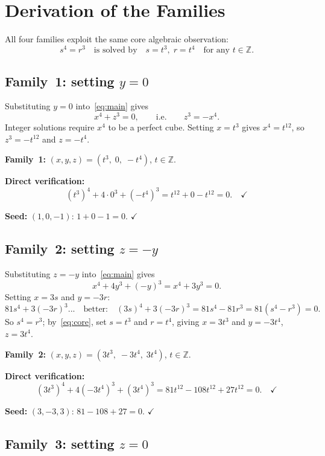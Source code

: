 \documentclass[12pt,a4paper]{article}
\theoremstyle{definition}
\newcommand{\Z}{\mathbb{Z}}
\begin{document}
\section{Derivation of the Families}\label{sec:derivation}

All four families exploit the same core algebraic observation:
\begin{equation}\label{eq:core}
  s^4 = r^3 \quad \text{is solved by} \quad s = t^3,\; r = t^4 \quad \text{for any } t \in \Z.
\end{equation}

\subsection{Family~1: setting $y = 0$}\label{sec:fam1}

Substituting $y = 0$ into~\eqref{eq:main} gives
\[
  x^4 + z^3 = 0, \qquad \text{i.e.} \qquad z^3 = -x^4.
\]
Integer solutions require $x^4$ to be a perfect cube.  Setting $x = t^3$
gives $x^4 = t^{12}$, so $z^3 = -t^{12}$ and $z = -t^4$.

\textbf{Family~1:} $(x, y, z) = (t^3,\; 0,\; -t^4)$, $t \in \Z$.

\textbf{Direct verification:}
\[
  (t^3)^4 + 4 \cdot 0^3 + (-t^4)^3 = t^{12} + 0 - t^{12} = 0.\quad\checkmark
\]

\textbf{Seed:} $(1, 0, -1)$: $1 + 0 - 1 = 0$. $\checkmark$

\subsection{Family~2: setting $z = -y$}\label{sec:fam2}

Substituting $z = -y$ into~\eqref{eq:main} gives
\[
  x^4 + 4y^3 + (-y)^3 = x^4 + 3y^3 = 0.
\]
Setting $x = 3s$ and $y = -3r$:
\[
  81s^4 + 3(-3r)^3... \quad\text{better:}\quad
  (3s)^4 + 3(-3r)^3 = 81s^4 - 81r^3 = 81(s^4 - r^3) = 0.
\]
So $s^4 = r^3$; by~\eqref{eq:core}, set $s = t^3$ and $r = t^4$, giving
$x = 3t^3$ and $y = -3t^4$, $z = 3t^4$.

\textbf{Family~2:} $(x, y, z) = (3t^3,\; -3t^4,\; 3t^4)$, $t \in \Z$.

\textbf{Direct verification:}
\[
  (3t^3)^4 + 4(-3t^4)^3 + (3t^4)^3
  = 81t^{12} - 108t^{12} + 27t^{12} = 0.\quad\checkmark
\]

\textbf{Seed:} $(3, -3, 3)$: $81 - 108 + 27 = 0$. $\checkmark$

\subsection{Family~3: setting $z = 0$}\label{sec:fam3}
\end{document}
